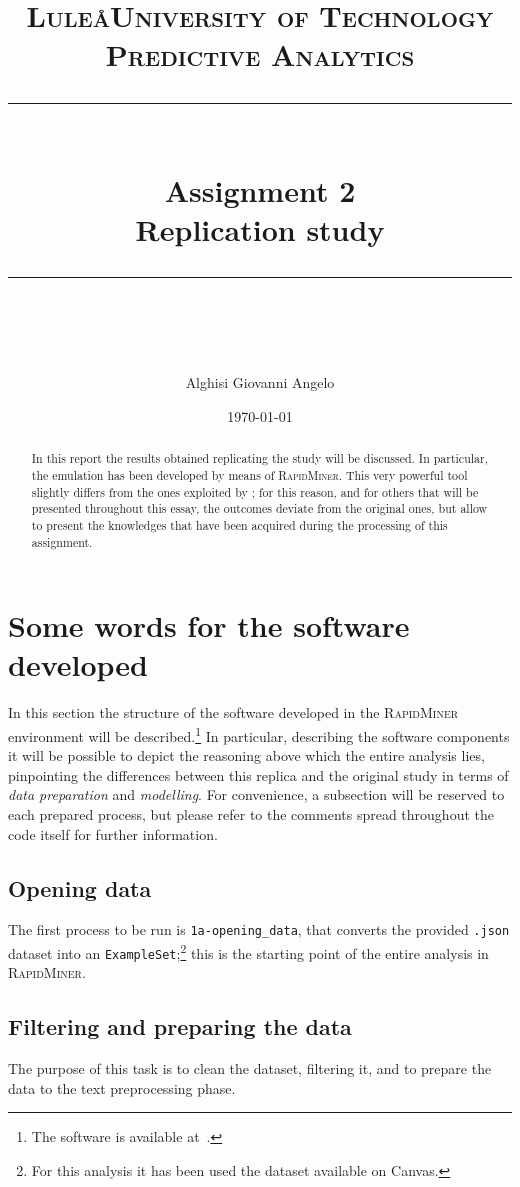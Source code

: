 \documentclass[a4paper]{article}
\title{
	\large 
	\textsc{Lule\aa University of Technology\\[5pt] 
		Predictive Analytics} \\[10pt]
	\rule{\linewidth}{0.5pt}\\
	\vspace{0.3cm}
	\Large Assignment 2\\
	\vspace{0.3cm}
	\huge \bf Replication study\normalsize
	\vspace{0.3cm}
	\rule{\linewidth}{0.5pt}  \\
}
\author{Alghisi Giovanni Angelo}
\date{\normalsize \today}
\begin{document}
	
	\maketitle
	
	\begin{abstract}
		In this report the results obtained replicating the study \cite{article:muller} will be discussed. In particular, the emulation has been developed by means of \textsc{RapidMiner}. This very powerful tool slightly differs from the ones exploited by \citeauthor{article:muller}; for this reason, and for others that will be presented throughout this essay, the outcomes deviate from the original ones, but allow to present the knowledges that have been acquired during the processing of this assignment. 
	\end{abstract}
	
	\tableofcontents
	
	\section{Some words for the software developed}
		In this section the structure of the software developed in the \textsc{RapidMiner} environment will be described.\footnote{The software is available at~\cite{repo:pa-assignment-2}.} In particular, describing the software components it will be possible to depict the reasoning above which the entire analysis lies, pinpointing the differences between this replica and the original study in terms of \emph{data preparation} and \emph{modelling}. For convenience, a subsection will be reserved to each prepared process, but please refer to the comments spread throughout the code itself for further information.
		
		\subsection{Opening data}
		 	The first process to be run is \verb|1a-opening_data|, that converts the provided \verb|.json| dataset into an \verb|ExampleSet|;\footnote{For this analysis it has been used the dataset available on Canvas.} this is the starting point of the entire analysis in \textsc{RapidMiner}.
		 
		 \subsection{Filtering and preparing the data}
		 	The purpose of this task is to clean the dataset, filtering it, and to prepare the data to the text preprocessing phase.
		 	
\end{document}
